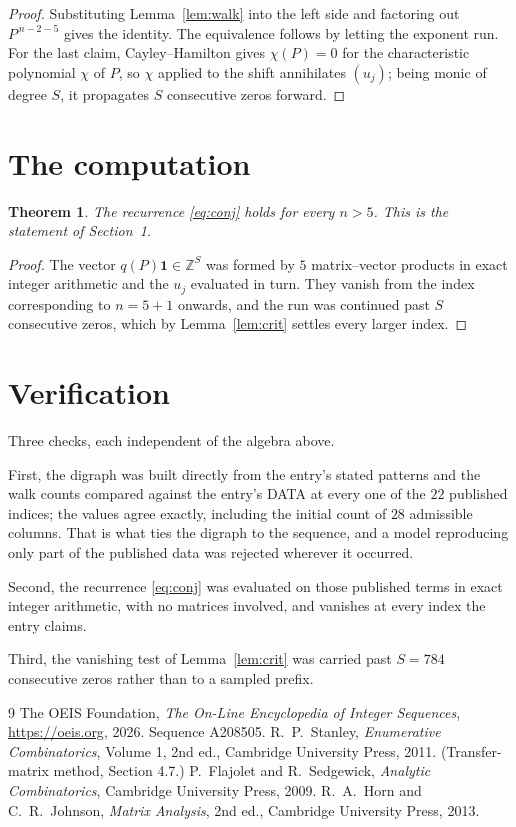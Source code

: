 \documentclass[11pt,a4paper]{article}
\theoremstyle{plain}
\newtheorem{theorem}{Theorem}
\theoremstyle{definition}
\begin{document}
\begin{proof}
Substituting Lemma~\ref{lem:walk} into the left side and factoring out
$P^{\,n-2-5}$ gives the identity. The equivalence follows by letting the exponent
run. For the last claim, Cayley--Hamilton gives $\chi(P)=0$ for the characteristic
polynomial $\chi$ of $P$, so $\chi$ applied to the shift annihilates $(u_j)$; being monic of
degree $S$, it propagates $S$ consecutive zeros forward.
\end{proof}

\section{The computation}

\begin{theorem}
The recurrence \eqref{eq:conj} holds for every $n>5$. This is the statement of
Section~1.
\end{theorem}

\begin{proof}
The vector $q(P)\mathbf{1}\in\mathbb{Z}^{S}$ was formed by $5$ matrix--vector
products in exact integer arithmetic and the $u_j$ evaluated in turn. They vanish from the
index corresponding to $n=5+1$ onwards, and the run was continued past $S$ consecutive
zeros, which by Lemma~\ref{lem:crit} settles every larger index.
\end{proof}

\section{Verification}

Three checks, each independent of the algebra above.

First, the digraph was built directly from the entry's stated patterns and the walk counts
compared against the entry's DATA at every one of the $22$ published indices; the
values agree exactly, including the initial count of $28$ admissible columns. That is
what ties the digraph to the sequence, and a model reproducing only part of the published
data was rejected wherever it occurred.

Second, the recurrence \eqref{eq:conj} was evaluated on those published terms in exact
integer arithmetic, with no matrices involved, and vanishes at every index the entry claims.

Third, the vanishing test of Lemma~\ref{lem:crit} was carried past $S=784$ consecutive
zeros rather than to a sampled prefix.

\begin{thebibliography}{9}
 The OEIS Foundation, \emph{The On-Line Encyclopedia of Integer
Sequences}, \url{https://oeis.org}, 2026. Sequence A208505.
 R.~P.~Stanley, \emph{Enumerative Combinatorics}, Volume 1, 2nd ed.,
Cambridge University Press, 2011. (Transfer-matrix method, Section 4.7.)
 P.~Flajolet and R.~Sedgewick, \emph{Analytic Combinatorics}, Cambridge
University Press, 2009.
 R.~A.~Horn and C.~R.~Johnson, \emph{Matrix Analysis}, 2nd ed., Cambridge
University Press, 2013.
\end{thebibliography}
\end{document}
